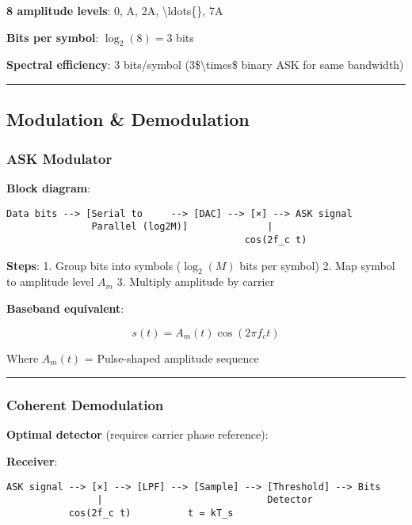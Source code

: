 \textbf{8 amplitude levels}: 0, A, 2A, \textbackslash ldots\{\}, 7A

\textbf{Bits per symbol}: \(\log_2(8) = 3\) bits

\textbf{Spectral efficiency}: 3 bits/symbol (3\$\textbackslash times\$
binary ASK for same bandwidth)

\begin{center}\rule{0.5\linewidth}{0.5pt}\end{center}

\subsection{Modulation \& Demodulation}\label{modulation-demodulation}

\subsubsection{ASK Modulator}\label{ask-modulator}

\textbf{Block diagram}:

\begin{verbatim}
Data bits --> [Serial to     --> [DAC] --> [×] --> ASK signal
               Parallel (log2M)]              |
                                          cos(2f_c t)
\end{verbatim}

\textbf{Steps}: 1. Group bits into symbols (\(\log_2(M)\) bits per
symbol) 2. Map symbol to amplitude level \(A_m\) 3. Multiply amplitude
by carrier

\textbf{Baseband equivalent}:

\[
s(t) = A_m(t) \cos(2\pi f_c t)
\]

Where \(A_m(t)\) = Pulse-shaped amplitude sequence

\begin{center}\rule{0.5\linewidth}{0.5pt}\end{center}

\subsubsection{Coherent Demodulation}\label{coherent-demodulation}

\textbf{Optimal detector} (requires carrier phase reference):

\textbf{Receiver}:

\begin{verbatim}
ASK signal --> [×] --> [LPF] --> [Sample] --> [Threshold] --> Bits
                |                             Detector
           cos(2f_c t)          t = kT_s
\end{verbatim}


